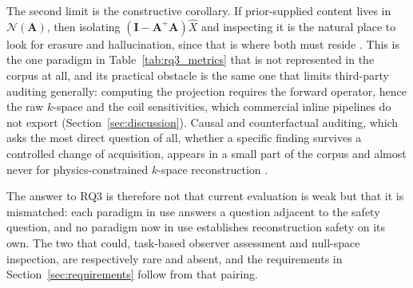 \documentclass[review,authoryear]{elsarticle}
\begin{document}
The second limit is the constructive corollary. If prior-supplied content lives in
$\mathcal{N}(\mathbf{A})$, then isolating $(\mathbf{I}-\mathbf{A}^{+}\mathbf{A})\hat{X}$
and inspecting it is the natural place to look for erasure and hallucination, since that
is where both must reside \citep{bhadra2021hallucinations,gottschling2020troublesome}. This is
the one paradigm in Table~\ref{tab:rq3_metrics} that is not represented in the corpus at
all, and its practical obstacle is the same one that limits third-party auditing
generally: computing the projection requires the forward operator, hence the raw
$k$-space and the coil sensitivities, which commercial inline pipelines do not export
(Section~\ref{sec:discussion}). Causal and counterfactual auditing, which asks the most
direct question of all, whether a specific finding survives a controlled change of
acquisition, appears in a small part of the corpus and almost never for
physics-constrained $k$-space reconstruction
\citep{pawlowski2020deep,gngr2023adaptive,wei2026latent}.

The answer to RQ3 is therefore not that current evaluation is weak but that it is
mismatched: each paradigm in use answers a question adjacent to the safety question,
and no paradigm now in use establishes reconstruction safety on its own. The two that
could, task-based observer assessment and null-space inspection, are respectively rare
and absent, and the requirements in Section~\ref{sec:requirements} follow from that
pairing.
\end{document}
